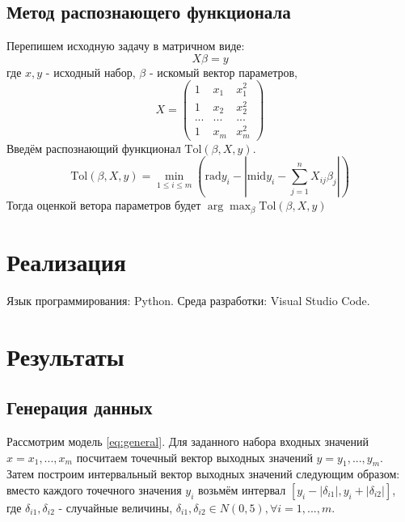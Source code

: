 \documentclass[a4paper,12pt]{article}
\begin{document}
    \subsection{Метод распознающего функционала}
    Перепишем исходную задачу в матричном виде:
    \begin{equation}
        X\beta = y
    \end{equation}
    где $ x, y $ - исходный набор, $ \beta $ - искомый вектор параметров,
    \begin{equation}
        X = 
        \begin{pmatrix}
            1 & x_{1} & x_{1}^2 \\
            1 & x_{2} & x_{2}^2 \\
            ... & ... & ... \\
            1 & x_{m} & x_{m}^2
        \end{pmatrix}
    \end{equation}
    \newline
    Введём распознающий функционал $ \text{Tol}(\beta, X, y) $.
    \begin{equation}
        \text{Tol}(\beta, X, y) = \min_{1 \leq i \leq m}(\text{rad}y_{i} - | \text{mid}y_{i} - \sum_{j = 1}^{n}X_{ij}\beta_{j} |)
    \end{equation}
    \newline
    Тогда оценкой ветора параметров будет $ \arg\max_{\beta}\text{Tol}(\beta, X, y) $
    
    \section{Реализация}
    Язык программирования: Python. Среда разработки: Visual Studio Code.

    \section{Результаты}
    \subsection{Генерация данных}
    Рассмотрим модель \ref{eq:general}. Для заданного набора входных значений $ x = {x_{1}, ..., x_{m}} $ посчитаем точечный вектор выходных значений $ y = {y_{1}, ..., y_{m}}$.
    Затем построим интервальный вектор выходных значений следующим образом: вместо каждого точечного значения $ y_{i} $ возьмём интервал $ [y_{i} - |\delta_{i1}|, y_{i} + |\delta_{i2}|] $,
    где $ \delta_{i1}, \delta_{i2} $ - случайные величины, $ \delta_{i1}, \delta_{i2} \in N(0, 5), \forall i = 1, ..., m $.
\end{document}
